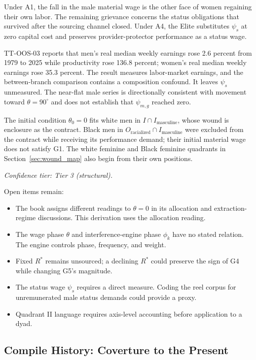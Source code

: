 \documentclass[12pt]{article}
\begin{document}
Under A1, the fall in the male material wage is the other face of women regaining their own labor. The remaining grievance concerns the status obligations that survived after the sourcing channel closed. Under A4, the Elite substitutes $\psi_s$ at zero capital cost and preserves provider-protector performance as a status wage.

TT-OOS-03 reports that men's real median weekly earnings rose 2.6 percent from 1979 to 2025 while productivity rose 136.8 percent; women's real median weekly earnings rose 35.3 percent. The result measures labor-market earnings, and the between-branch comparison contains a composition confound. It leaves $\psi_s$ unmeasured. The near-flat male series is directionally consistent with movement toward $\theta=90^\circ$ and does not establish that $\psi_{m,g}$ reached zero.

The initial condition $\theta_0=0$ fits white men in $I\cap I_{\text{masculine}}$, whose wound is enclosure as the contract. Black men in $O_{\text{racialized}}\cap I_{\text{masculine}}$ were excluded from the contract while receiving its performance demand; their initial material wage does not satisfy G1. The white feminine and Black feminine quadrants in Section~\ref{sec:wound_map} also begin from their own positions.

\noindent\textit{Confidence tier: Tier 3 (structural).}

Open items remain:
\begin{itemize}
  \item The book assigns different readings to $\theta=0$ in its allocation and extraction-regime discussions. This derivation uses the allocation reading.
  \item The wage phase $\theta$ and interference-engine phase $\phi_k$ have no stated relation. The engine controls phase, frequency, and weight.
  \item Fixed $R^*$ remains unsourced; a declining $R^*$ could preserve the sign of G4 while changing G5's magnitude.
  \item The status wage $\psi_s$ requires a direct measure. Coding the reel corpus for unremunerated male status demands could provide a proxy.
  \item Quadrant II language requires axis-level accounting before application to a dyad.
\end{itemize}

\subsection{Compile History: Coverture to the Present}
\end{document}
